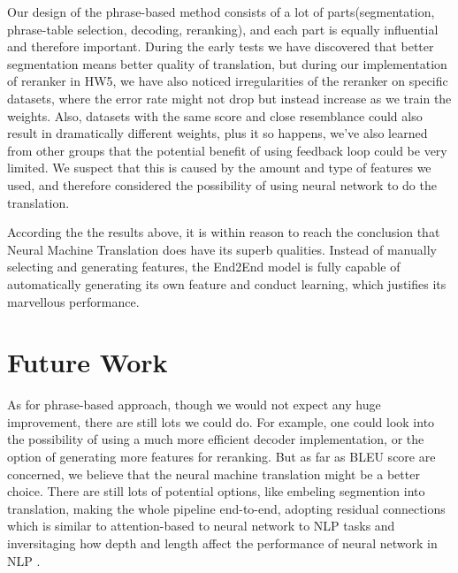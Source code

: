 \documentclass[11pt,letterpaper]{article}
\begin{document}
Our design of the phrase-based method consists of a lot of parts(segmentation, phrase-table selection, decoding, reranking), and each part is equally influential and therefore important.
During the early tests we have discovered that better segmentation means better quality of translation, but during our implementation of reranker in HW5, we have also noticed irregularities of the reranker on specific datasets, where the error rate might not drop but instead increase as we train the weights. Also, datasets with the same score and close resemblance could also result in dramatically different weights, plus it so happens, we’ve also learned from other groups that the potential benefit of using feedback loop could be very limited. We suspect that this is caused by the amount and type of features we used, and therefore considered the possibility of using neural network to do the translation.

According the the results above, it is within reason to reach the conclusion that Neural Machine Translation does have its superb qualities. Instead of manually selecting and generating features, the End2End model is fully capable of automatically generating its own feature and conduct learning, which justifies its marvellous performance.


\section{Future Work}
As for phrase-based approach, though we would not expect any huge improvement, there are still lots we could do. For example, one could look into the possibility of using a much more efficient decoder implementation, or the option of generating more features for reranking. But as far as BLEU score are concerned, we believe that the neural machine translation might be a better choice. There are still lots of potential options, like embeling segmention into translation, making the whole pipeline end-to-end, adopting residual connections\cite{He2015} which is similar to attention-based to neural network to NLP tasks and inversitaging how depth and length affect the performance of neural network in NLP\cite{NIPS_deep} .



\end{document}
